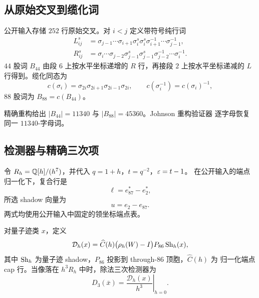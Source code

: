 \subsection{从原始交叉到缆化词}

公开输入存储 $252$ 行原始交叉。对 $i<j$ 定义带符号纯行词
\begin{align}
L_{ij}^{s}
 &=\sigma_{j-1}\cdots\sigma_{i+1}
   \sigma_i^{s}\sigma_i^{s}
   \sigma_{i+1}^{-1}\cdots\sigma_{j-1}^{-1},
\label{eq:L-row}\\
R_{ij}^{s}
 &=\sigma_i\cdots\sigma_{j-2}
   \sigma_{j-1}^{s}\sigma_{j-1}^{s}
   \sigma_{j-2}^{-1}\cdots\sigma_i^{-1}.
\label{eq:R-row}
\end{align}
$44$ 股词 $B_{44}$ 由段 $6$ 上按水平坐标递增的 $R$ 行，再接段 $2$ 上按水平坐标递减的
$L$ 行得到。缆化同态为
\begin{equation}\label{eq:cabling}
c(\sigma_i)=\sigma_{2i}\sigma_{2i+1}\sigma_{2i-1}\sigma_{2i},
\qquad
c(\sigma_i^{-1})=c(\sigma_i)^{-1},
\end{equation}
$88$ 股词为 $B_{88}=c(B_{44})$。

\begin{proposition}[词恒等式]\label{prop:word-identities}
精确重构给出 $|B_{44}|=11340$ 与 $|B_{88}|=45360$。Johnson 重构验证器
逐字母恢复同一 $11340$-字母词。
\end{proposition}

\subsection{检测器与精确三次项}

令 $R_h=\mathbb{Q}[h]/(h^7)$，并代入 $q=1+h$，$t=q^{-2}$，$\varepsilon=t-1$。
在公开输入的端点归一化下，复合行是
\begin{equation}\label{eq:ell}
\ell=e_{87}^{*}-e_2^{*},
\end{equation}
所选 shadow 向量为
\begin{equation}\label{eq:u}
u=e_2-e_{87}.
\end{equation}
两式均使用公开输入中固定的领坐标端点表。

\begin{definition}[除法三次检测器]\label{def:detector}
对量子迹类 $x$，定义
\[
\mathcal D_h(x)=
\widehat C(h)\bigl(\rho_h(W)-I\bigr)P_{86}\operatorname{Sh}_h(x),
\]
其中 $\operatorname{Sh}_h$ 为量子迹 shadow，$P_{86}$ 投影到 through-$86$ 顶胞，$\widehat C(h)$ 为
归一化端点 cap 行。当像落在 $h^3R_h$ 中时，除法三次检测器为
\begin{equation}\label{eq:D3}
D_3(\bar x)=\left.\frac{\mathcal D_h(x)}{h^3}\right|_{h=0}.
\end{equation}
\end{definition}

